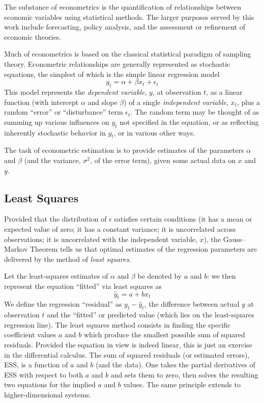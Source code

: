 \documentclass{article}
\begin{document}
The substance of econometrics is the quantification of relationships
between economic variables using statistical methods.  The larger
purposes served by this work include forecasting, policy analysis,
and the assessment or refinement of economic theories.

Much of econometrics is based on the classical statistical paradigm of
sampling theory.  Econometric relationships are generally represented
as stochastic equations, the simplest of which is the simple linear
regression model
$$y_t = \alpha + \beta x_t + \epsilon_t$$
This model represents the
\textit{dependent variable}, $y$, at observation $t$, as a linear
function (with intercept $\alpha$ and slope $\beta$) of a single
\textit{independent variable}, $x_t$, plus a random ``error'' or
``disturbance'' term $\epsilon_t$.  The random term may be thought of
as summing up various influences on $y_t$ not specified in the
equation, or as reflecting inherently stochastic behavior in $y_t$, or
in various other ways.

The task of econometric estimation is to provide estimates of the
parameters $\alpha$ and $\beta$ (and the variance, $\sigma^2$, of the
error term), given some actual data on $x$ and $y$. 

\subsection{Least Squares}

Provided that the distribution of $\epsilon$ satisfies certain
conditions (it has a mean or expected value of zero; it has a constant
variance; it is uncorrelated across observations; it is uncorrelated
with the independent variable, $x$), the Gauss--Markov Theorem tells
us that optimal estimates of the regression parameters are delivered
by the method of \textit{least squares}.

Let the least-squares estimates of $\alpha$ and $\beta$ be denoted by
$a$ and $b$: we then represent the equation ``fitted'' via least
squares as
$$\hat{y}_t = a + b x_t$$
We define the regression ``residual'' as
$y_t - \hat{y}_t$, the difference between actual $y$ at observation
$t$ and the ``fitted'' or predicted value (which lies on the
least-squares regression line).  The least squares method consists in
finding the specific coefficient values $a$ and $b$ which produce the
smallest possible sum of squared residuals.  Provided the equation in
view is indeed linear, this is just an exercise in the differential
calculus. The sum of squared residuals (or estimated errors), ESS, is a
function of $a$ and $b$ (and the data).  One takes the partial
derivatives of ESS with respect to both $a$ and $b$ and sets them to
zero, then solves the resulting two equations for the implied $a$ and
$b$ values.  The same principle extends to higher-dimensional systems.
\end{document}
